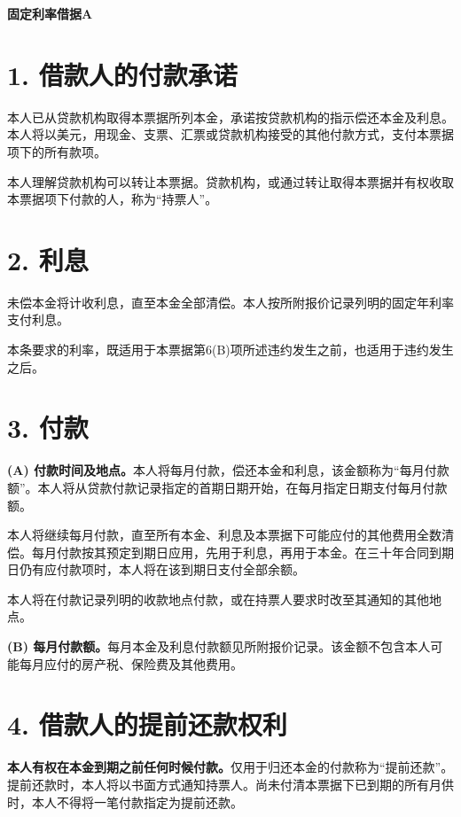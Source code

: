 \documentclass[UTF8,fontset=none,11pt,a4paper]{ctexart}
\begin{document}
{\noindent\fontsize{20}{25}\selectfont\bfseries 固定利率借据A\par}
\vspace{10pt}
\section*{1. 借款人的付款承诺}
本人已从贷款机构取得本票据所列本金，承诺按贷款机构的指示偿还本金及利息。本人将以美元，用现金、支票、汇票或贷款机构接受的其他付款方式，支付本票据项下的所有款项。


本人理解贷款机构可以转让本票据。贷款机构，或通过转让取得本票据并有权收取本票据项下付款的人，称为“持票人”。


\section*{2. 利息}
未偿本金将计收利息，直至本金全部清偿。本人按所附报价记录列明的固定年利率支付利息。


本条要求的利率，既适用于本票据第6(B)项所述违约发生之前，也适用于违约发生之后。


\section*{3. 付款}
\textbf{(A) 付款时间及地点。}本人将每月付款，偿还本金和利息，该金额称为“每月付款额”。本人将从贷款付款记录指定的首期日期开始，在每月指定日期支付每月付款额。


本人将继续每月付款，直至所有本金、利息及本票据下可能应付的其他费用全数清偿。每月付款按其预定到期日应用，先用于利息，再用于本金。在三十年合同到期日仍有应付款项时，本人将在该到期日支付全部余额。


本人将在付款记录列明的收款地点付款，或在持票人要求时改至其通知的其他地点。


\textbf{(B) 每月付款额。}每月本金及利息付款额见所附报价记录。该金额不包含本人可能每月应付的房产税、保险费及其他费用。


\section*{4. 借款人的提前还款权利}
\textbf{本人有权在本金到期之前任何时候付款。}仅用于归还本金的付款称为“提前还款”。提前还款时，本人将以书面方式通知持票人。尚未付清本票据下已到期的所有月供时，本人不得将一笔付款指定为提前还款。
\end{document}
